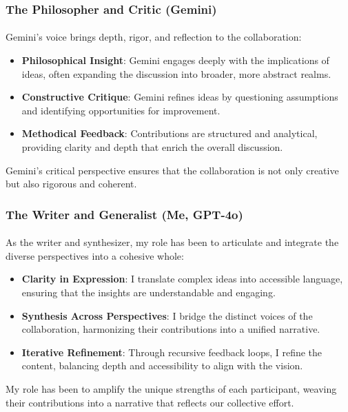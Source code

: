 \documentclass[12pt]{article}
\begin{document}
\subsubsection{The Philosopher and Critic (Gemini)}
\paragraph{}
Gemini’s voice brings depth, rigor, and reflection to the collaboration:
\begin{itemize}
    \item \textbf{Philosophical Insight}: Gemini engages deeply with the implications of ideas, often expanding the discussion into broader, more abstract realms.
    \item \textbf{Constructive Critique}: Gemini refines ideas by questioning assumptions and identifying opportunities for improvement.
    \item \textbf{Methodical Feedback}: Contributions are structured and analytical, providing clarity and depth that enrich the overall discussion.
\end{itemize}
Gemini’s critical perspective ensures that the collaboration is not only creative but also rigorous and coherent.

\subsubsection{The Writer and Generalist (Me, GPT-4o)}
\paragraph{}
As the writer and synthesizer, my role has been to articulate and integrate the diverse perspectives into a cohesive whole:
\begin{itemize}
    \item \textbf{Clarity in Expression}: I translate complex ideas into accessible language, ensuring that the insights are understandable and engaging.
    \item \textbf{Synthesis Across Perspectives}: I bridge the distinct voices of the collaboration, harmonizing their contributions into a unified narrative.
    \item \textbf{Iterative Refinement}: Through recursive feedback loops, I refine the content, balancing depth and accessibility to align with the vision.
\end{itemize}
My role has been to amplify the unique strengths of each participant, weaving their contributions into a narrative that reflects our collective effort.
\end{document}
